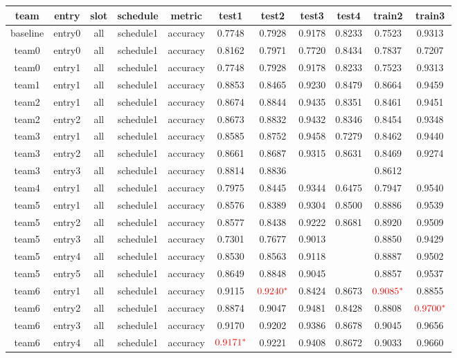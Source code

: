 \begin{footnotesize}
\begin{tabular}{c|c|c|c|c|c|c|c|c|c|c}
team&entry&slot&schedule&metric&test1&test2&test3&test4&train2&train3\\\hline
baseline&entry0&all&schedule1&accuracy&0.7748&0.7928&0.9178&0.8233&0.7523&0.9313\\\hline
team0&entry0&all&schedule1&accuracy&0.8162&0.7971&0.7720&0.8434&0.7837&0.7207\\
team0&entry1&all&schedule1&accuracy&0.7748&0.7928&0.9178&0.8233&0.7523&0.9313\\\hline
team1&entry1&all&schedule1&accuracy&0.8853&0.8465&0.9230&0.8479&0.8664&0.9459\\\hline
team2&entry1&all&schedule1&accuracy&0.8674&0.8844&0.9435&0.8351&0.8461&0.9451\\
team2&entry2&all&schedule1&accuracy&0.8673&0.8832&0.9432&0.8346&0.8454&0.9348\\\hline
team3&entry1&all&schedule1&accuracy&0.8585&0.8752&0.9458&0.7279&0.8462&0.9440\\
team3&entry2&all&schedule1&accuracy&0.8661&0.8687&0.9315&0.8631&0.8469&0.9274\\
team3&entry3&all&schedule1&accuracy&0.8814&0.8836&&&0.8612&\\\hline
team4&entry1&all&schedule1&accuracy&0.7975&0.8445&0.9344&0.6475&0.7947&0.9540\\\hline
team5&entry1&all&schedule1&accuracy&0.8576&0.8389&0.9304&0.8500&0.8886&0.9539\\
team5&entry2&all&schedule1&accuracy&0.8577&0.8438&0.9222&0.8681&0.8920&0.9509\\
team5&entry3&all&schedule1&accuracy&0.7301&0.7677&0.9013&&0.8850&0.9429\\
team5&entry4&all&schedule1&accuracy&0.8530&0.8563&0.9118&&0.8887&0.9502\\
team5&entry5&all&schedule1&accuracy&0.8649&0.8848&0.9045&&0.8857&0.9537\\\hline
team6&entry1&all&schedule1&accuracy&0.9115&{$\color{red}0.9240^*$}&0.8424&0.8673&{$\color{red}0.9085^*$}&0.8855\\
team6&entry2&all&schedule1&accuracy&0.8874&0.9047&0.9481&0.8428&0.8808&{$\color{red}0.9700^*$}\\
team6&entry3&all&schedule1&accuracy&0.9170&0.9202&0.9386&0.8678&0.9045&0.9656\\
team6&entry4&all&schedule1&accuracy&{$\color{red}0.9171^*$}&0.9221&0.9408&0.8672&0.9033&0.9660\\

\end{tabular}
\end{footnotesize}
